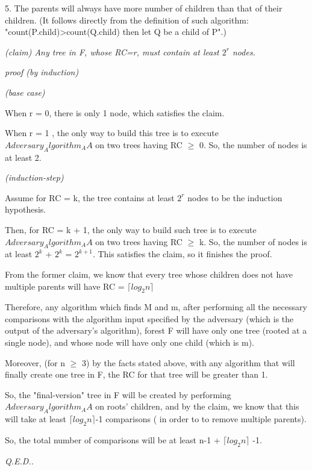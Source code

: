 \documentclass[a4paper, 10pt]{article}
\begin{document}
{5. The parents will always have more number of children than that of their children. (It follows directly from the definition of such algorithm: "count(P.child)>count(Q.child) then let Q be a child of P".)

{\it
(claim) Any tree in F, whose RC=r, must contain at least $2^r$ nodes.
}
\begin{addmargin}[15pt]{0in}
{
\textit{proof (by induction)}

\noindent\textit{(base case)}

When r = 0, there is only 1 node, which satisfies the claim.

When r = 1 , the only way to build this tree is to execute $Adversary_Algorithm_AA$ on two trees having RC $\ge$ 0. So, the number of nodes is at least 2.

\noindent\textit{(induction-step)}

Assume for RC = k, the tree contains at least $2^r$ nodes to be the induction hypothesis.

Then, for RC = k + 1, the only way to build such tree is to execute $Adversary_Algorithm_AA$ on two trees having RC $\ge$ k. So, the number of nodes is at least $2^k$ + $2^k$ = $2^{k+1}$. This satisfies the claim, so it finishes the proof.
}
From the former claim, we know that every tree whose children does not have multiple parents will have RC = $\lceil log_2 n \rceil$

Therefore, any algorithm which finds M and m, after performing all the necessary comparisons with the algorithm input specified by the adversary (which is the output of the adversary's algorithm), forest F will have only one tree (rooted at a single node), and whose node will have only one child (which is m). 

Moreover, (for n $\geq$ 3) by the facts stated above, with any algorithm that will finally create one tree in F, the RC for that tree will be greater than 1. 

So, the "final-version" tree in F will be created by performing $Adversary_Algorithm_AA$ on roots' children, and by the claim, we know that this will take at least $\lceil log_2 n \rceil$-1 comparisons ( in order to to remove multiple parents).

So, the total number of comparisons will be at least n-1 + $\lceil log_2 n \rceil$ -1. 

\textit{Q.E.D..}
\end{addmargin}

}
\end{document}
